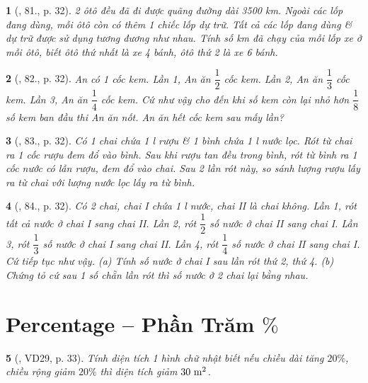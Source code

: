 \documentclass{article}
\newtheorem{baitoan}{}
\begin{document}
\begin{baitoan}[\cite{Binh_Toan_6_tap_2}, 81., p. 32]
	2 ôtô đều đã đi được quãng đường dài {\rm3500 km}. Ngoài các lốp đang dùng, mỗi ôtô còn có thêm 1 chiếc lốp dự trữ. Tất cả các lốp đang dùng \& dự trữ được sử dụng tương đương như nhau. Tính số {\rm km} đã chạy của mỗi lốp xe ở mỗi ôtô, biết ôtô thứ nhất là xe 4 bánh, ôtô thứ 2 là xe 6 bánh.
\end{baitoan}

\begin{baitoan}[\cite{Binh_Toan_6_tap_2}, 82., p. 32]
	An có 1 cốc kem. Lần 1, An ăn $\dfrac{1}{2}$ cốc kem. Lần 2, An ăn $\dfrac{1}{3}$ cốc kem. Lần 3, An ăn $\dfrac{1}{4}$ cốc kem. Cứ như vậy cho đến khi số kem còn lại nhỏ hơn $\dfrac{1}{8}$  số kem ban đầu thi An ăn nốt. An ăn hết cốc kem sau mấy lần?
\end{baitoan}

\begin{baitoan}[\cite{Binh_Toan_6_tap_2}, 83., p. 32]
	Có 1 chai chứa {\rm1 l} rượu \& 1 bình chứa {\rm1 l} nước lọc. Rót từ chai ra 1 cốc rượu đem đổ vào bình. Sau khi rượu tan đều trong bình, rót từ bình ra 1 cốc nước có lẫn rượu, đem đổ vào chai. Sau 2 lần rót này, so sánh lượng rượu lấy ra từ chai với lượng nước lọc lấy ra từ bình.
\end{baitoan}

\begin{baitoan}[\cite{Binh_Toan_6_tap_2}, 84., p. 32]
	Có 2 chai, chai I chứa {\rm1 l} nước, chai II là chai không. Lần 1, rót tất cả nước ở chai I sang chai II. Lần 2, rót $\dfrac{1}{2}$ số nước ở chai II sang chai I. Lần 3, rót $\dfrac{1}{3}$ số nước ở chai I sang chai II. Lần 4, rót $\dfrac{1}{4}$ số nước ở chai II sang chai I. Cứ tiếp tục như vậy. (a) Tính số nước ở chai I sau lần rót thứ 2, thứ 4. (b) Chứng tỏ cứ sau 1 số chẵn lần rót thì số nước ở 2 chai lại bằng nhau.
\end{baitoan}


\section{Percentage -- Phần Trăm $\%$}

\begin{baitoan}[\cite{Binh_Toan_6_tap_2}, VD29, p. 33]
	Tính diện tích 1 hình chữ nhật biết nếu chiều dài tăng $20\%$, chiều rộng giảm $20\%$ thì diện tích giảm $\rm30\ m^2$.
\end{baitoan}
\end{document}
